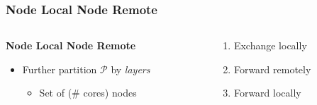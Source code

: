 \documentclass{beamer}
\begin{document}

\begin{frame}
\frametitle{Node Local Node Remote}


\begin{columns}
	\begin{column}{0.5\textwidth}
		\textbf{Node Local Node Remote}
		\begin{itemize}
			\item Further partition $\mathcal{P}$ by \emph{layers}
			\begin{itemize}
				\item Set of (\# cores) nodes
			\end{itemize}
		\end{itemize}
	\end{column}
	\begin{column}{0.5\textwidth}  %
		\begin{enumerate}
			\item Exchange locally	
			\item Forward remotely
			\item Forward locally
		\end{enumerate}
	\end{column}
\end{columns}


\end{frame}
\end{document}
